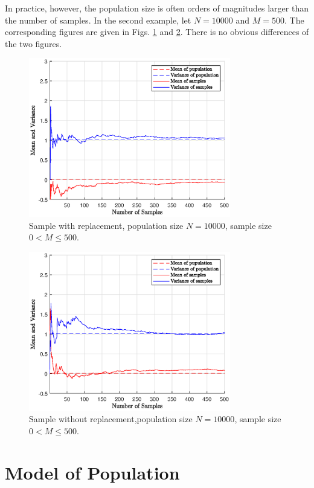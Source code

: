 In practice, however, the population size is often orders of magnitudes larger than the number of samples. In the second example, let $N=10000$ and $M=500$. The corresponding figures are given in Figs. \ref{ch:sampling:fig:sample-wr-n10000} and \ref{ch:sampling:fig:sample-nwr-n10000}. There is no obvious differences of the two figures.

\begin{figure}
	\centering
	\includegraphics[width=250pt]{chapters/ch-sampling/figures/sample-wr-n10000.eps}
	\caption{Sample with replacement, population size $N=10000$, sample size $0< M\leq500$.} \label{ch:sampling:fig:sample-wr-n10000}
\end{figure}

\begin{figure}
	\centering
	\includegraphics[width=250pt]{chapters/ch-sampling/figures/sample-nwr-n10000.eps}
	\caption{Sample without replacement,population size $N=10000$, sample size $0< M\leq500$.} \label{ch:sampling:fig:sample-nwr-n10000}
\end{figure}

\section{Model of Population}

